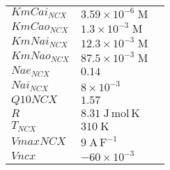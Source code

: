 \documentclass[a4paper,10.0pt]{article}
\begin{document}
{\begin{longtabu}{| l l l |}
  $KmCai_{NCX}$\hspace{0.5cm} & $3.59\!\times\!10 ^{-6}\;\mathrm{M}$\hspace{0.5cm} & \hspace{0.5cm}\\
  $KmCao_{NCX}$\hspace{0.5cm} & $1.3\!\times\!10 ^{-3}\;\mathrm{M}$\hspace{0.5cm} & \hspace{0.5cm}\\
  $KmNai_{NCX}$\hspace{0.5cm} & $12.3\!\times\!10 ^{-3}\;\mathrm{M}$\hspace{0.5cm} & \hspace{0.5cm}\\
  $KmNao_{NCX}$\hspace{0.5cm} & $87.5\!\times\!10 ^{-3}\;\mathrm{M}$\hspace{0.5cm} & \hspace{0.5cm}\\
  $Nae_{NCX}$\hspace{0.5cm} & $0.14$\hspace{0.5cm} & \hspace{0.5cm}\\
  $Nai_{NCX}$\hspace{0.5cm} & $8\!\times\!10 ^{-3}$\hspace{0.5cm} & \hspace{0.5cm}\\
  $Q10NCX$\hspace{0.5cm} & $1.57$\hspace{0.5cm} & \hspace{0.5cm}\\
  $R$\hspace{0.5cm} & $8.31\;\mathrm{J}\,\mathrm{mol}\,\mathrm{K}$\hspace{0.5cm} & \hspace{0.5cm}\\
  $T_{NCX}$\hspace{0.5cm} & $310\;\mathrm{K}$\hspace{0.5cm} & \hspace{0.5cm}\\
  $VmaxNCX$\hspace{0.5cm} & $9\;\mathrm{A}\,\mathrm{F}^{-1}$\hspace{0.5cm} & \hspace{0.5cm}\\
  $Vncx$\hspace{0.5cm} & $-60\!\times\!10 ^{-3}$\hspace{0.5cm} & \hspace{0.5cm}\\

\end{longtabu}}
\end{document}
